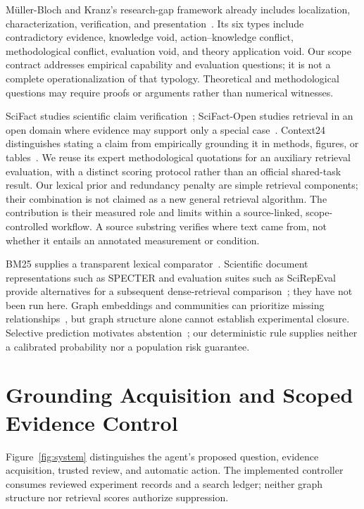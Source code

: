 \documentclass[runningheads]{llncs}
\begin{document}
M\"uller-Bloch and Kranz's research-gap framework already includes localization, characterization, verification, and presentation~\cite{mullerbloch2015}. Its six types include contradictory evidence, knowledge void, action--knowledge conflict, methodological conflict, evaluation void, and theory application void. Our scope contract addresses empirical capability and evaluation questions; it is not a complete operationalization of that typology. Theoretical and methodological questions may require proofs or arguments rather than numerical witnesses.

SciFact studies scientific claim verification~\cite{wadden2020}; SciFact-Open studies retrieval in an open domain where evidence may support only a special case~\cite{wadden2022}. Context24 distinguishes stating a claim from empirically grounding it in methods, figures, or tables~\cite{chan2024}. We reuse its expert methodological quotations for an auxiliary retrieval evaluation, with a distinct scoring protocol rather than an official shared-task result. Our lexical prior and redundancy penalty are simple retrieval components; their combination is not claimed as a new general retrieval algorithm. The contribution is their measured role and limits within a source-linked, scope-controlled workflow. A source substring verifies where text came from, not whether it entails an annotated measurement or condition.

BM25 supplies a transparent lexical comparator~\cite{robertson2009}. Scientific document representations such as SPECTER and evaluation suites such as SciRepEval provide alternatives for a subsequent dense-retrieval comparison~\cite{cohan2020,singh2023}; they have not been run here. Graph embeddings and communities can prioritize missing relationships~\cite{bordes2013,blondel2008}, but graph structure alone cannot establish experimental closure. Selective prediction motivates abstention~\cite{geifman2017}; our deterministic rule supplies neither a calibrated probability nor a population risk guarantee.

\section{Grounding Acquisition and Scoped Evidence Control}
Figure~\ref{fig:system} distinguishes the agent's proposed question, evidence acquisition, trusted review, and automatic action. The implemented controller consumes reviewed experiment records and a search ledger; neither graph structure nor retrieval scores authorize suppression.
\end{document}
